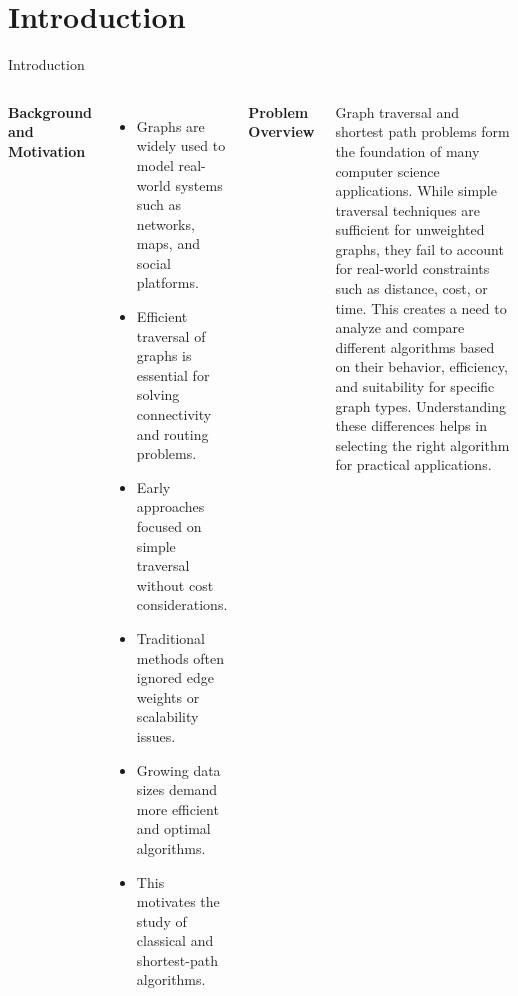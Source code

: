\documentclass[dvipsnames,mathserif,aspectratio=169,10pt]{beamer}
\begin{document}
\section{Introduction}
\begin{frame}{Introduction}
\begin{columns}

\textbf{Background and Motivation}
\begin{itemize}
    \item Graphs are widely used to model real-world systems such as networks, maps, and social platforms.
    \item Efficient traversal of graphs is essential for solving connectivity and routing problems.
    \item Early approaches focused on simple traversal without cost considerations.
    \item Traditional methods often ignored edge weights or scalability issues.
    \item Growing data sizes demand more efficient and optimal algorithms.
    \item This motivates the study of classical and shortest-path algorithms.
\end{itemize}

\textbf{Problem Overview}

Graph traversal and shortest path problems form the foundation of many computer science applications. While simple traversal techniques are sufficient for unweighted graphs, they fail to account for real-world constraints such as distance, cost, or time. This creates a need to analyze and compare different algorithms based on their behavior, efficiency, and suitability for specific graph types. Understanding these differences helps in selecting the right algorithm for practical applications.

\end{columns}
\transfade[duration=0.2]
\end{frame}
\end{document}

